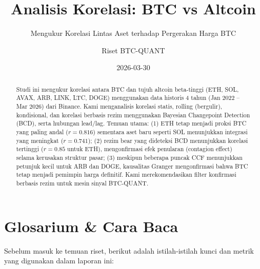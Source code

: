 \documentclass[
  11pt,
  a4paper,
]{article}
\title{Analisis Korelasi: BTC vs Altcoin}
\subtitle{Mengukur Korelasi Lintas Aset terhadap Pergerakan Harga BTC}
\author{Riset BTC-QUANT}
\date{2026-03-30}
\begin{document}
\maketitle
\begin{abstract}
Studi ini mengukur korelasi antara BTC dan tujuh altcoin beta-tinggi
(ETH, SOL, AVAX, ARB, LINK, LTC, DOGE) menggunakan data historis 4 tahun
(Jan 2022 -- Mar 2026) dari Binance. Kami menganalisis korelasi statis,
rolling (bergulir), kondisional, dan korelasi berbasis rezim menggunakan
Bayesian Changepoint Detection (BCD), serta hubungan lead/lag. Temuan
utama: (1) ETH tetap menjadi proksi BTC yang paling andal (\(r=0.816\))
sementara aset baru seperti SOL menunjukkan integrasi yang meningkat
(\(r=0.741\)); (2) rezim bear yang dideteksi BCD menunjukkan korelasi
tertinggi (\(r=0.85\) untuk ETH), mengonfirmasi efek penularan
(contagion effect) selama kerusakan struktur pasar; (3) meskipun
beberapa puncak CCF menunjukkan petunjuk kecil untuk ARB dan DOGE,
kausalitas Granger mengonfirmasi bahwa BTC tetap menjadi pemimpin harga
definitif. Kami merekomendasikan filter konfirmasi berbasis rezim untuk
mesin sinyal BTC-QUANT.
\end{abstract}


\section{Glosarium \& Cara Baca}\label{sec-glossary}

Sebelum masuk ke temuan riset, berikut adalah istilah-istilah kunci dan
metrik yang digunakan dalam laporan ini:
\end{document}

